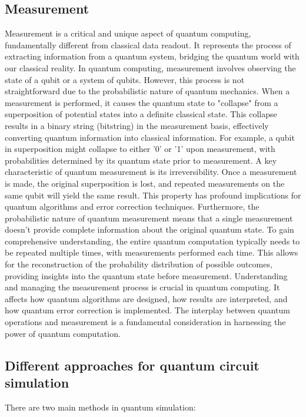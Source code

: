 \documentclass[12pt,oneside,a4paper]{article}
\begin{document}
\subsection{Measurement}
Measurement is a critical and unique aspect of quantum computing, fundamentally different from classical data readout. It represents the process of extracting information from a quantum system, bridging the quantum world with our classical reality.
In quantum computing, measurement involves observing the state of a qubit or a system of qubits. However, this process is not straightforward due to the probabilistic nature of quantum mechanics. When a measurement is performed, it causes the quantum state to "collapse" from a superposition of potential states into a definite classical state.
This collapse results in a binary string (bitstring) in the measurement basis, effectively converting quantum information into classical information. For example, a qubit in superposition might collapse to either '0' or '1' upon measurement, with probabilities determined by its quantum state prior to measurement.
A key characteristic of quantum measurement is its irreversibility. Once a measurement is made, the original superposition is lost, and repeated measurements on the same qubit will yield the same result. This property has profound implications for quantum algorithms and error correction techniques.
Furthermore, the probabilistic nature of quantum measurement means that a single measurement doesn't provide complete information about the original quantum state. To gain comprehensive understanding, the entire quantum computation typically needs to be repeated multiple times, with measurements performed each time. This allows for the reconstruction of the probability distribution of possible outcomes, providing insights into the quantum state before measurement.
Understanding and managing the measurement process is crucial in quantum computing. It affects how quantum algorithms are designed, how results are interpreted, and how quantum error correction is implemented. The interplay between quantum operations and measurement is a fundamental consideration in harnessing the power of quantum computation.

\subsection{Different approaches for quantum circuit simulation}
There are two main methods in quantum simulation: \\
\end{document}
